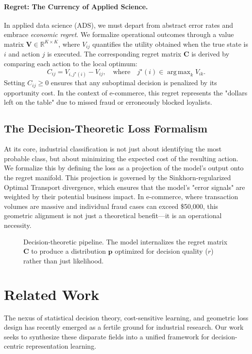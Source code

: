 \documentclass[sigconf,anonymous]{acmart}
\newcommand{\vp}{\mathbf{p}}
\newcommand{\mC}{\mathbf{C}}
\newcommand{\mV}{\mathbf{V}}
\newcommand{\R}{\mathbb{R}}
\DeclareMathOperator*{\argmax}{arg\,max}
\begin{document}
\paragraph{Regret: The Currency of Applied Science.}
In applied data science (ADS), we must depart from abstract error rates and embrace \emph{economic regret}. We formalize operational outcomes through a value matrix $\mV \in \R^{K \times K}$, where $V_{ij}$ quantifies the utility obtained when the true state is $i$ and action $j$ is executed. The corresponding regret matrix $\mC$ is derived by comparing each action to the local optimum:
\begin{equation}
C_{ij} = V_{i, j^\star(i)} - V_{ij}, \quad \text{where} \quad j^\star(i) \in \argmax_{k} V_{ik}.
\end{equation}
Setting $C_{ij} \ge 0$ ensures that any suboptimal decision is penalized by its opportunity cost. In the context of e-commerce, this regret represents the "dollars left on the table" due to missed fraud or erroneously blocked loyalists.

\subsection{The Decision-Theoretic Loss Formalism}
At its core, industrial classification is not just about identifying the most probable class, but about minimizing the expected cost of the resulting action. We formalize this by defining the loss as a projection of the model's output onto the regret manifold. This projection is governed by the Sinkhorn-regularized Optimal Transport divergence, which ensures that the model's "error signals" are weighted by their potential business impact. In e-commerce, where transaction volumes are massive and individual fraud cases can exceed \$50,000, this geometric alignment is not just a theoretical benefit—it is an operational necessity.

\begin{figure}[h]
\centering
\scalebox{0.60}{}
\caption{Decision-theoretic pipeline. The model internalizes the regret matrix $\mC$ to produce a distribution $\vp$ optimized for decision quality ($r$) rather than just likelihood.}
\label{fig:pipeline_cost}
\end{figure}

\section{Related Work}
The nexus of statistical decision theory, cost-sensitive learning, and geometric loss design has recently emerged as a fertile ground for industrial research. Our work seeks to synthesize these disparate fields into a unified framework for decision-centric representation learning.
\end{document}
